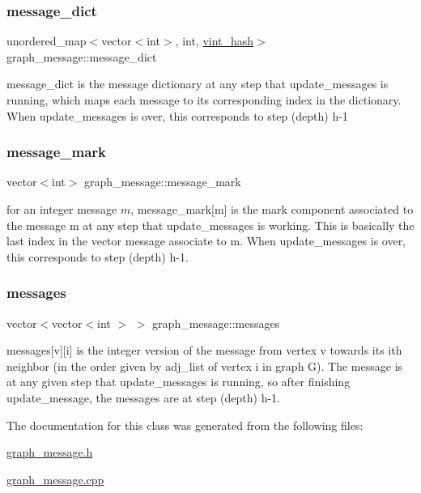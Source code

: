 \subsubsection{\texorpdfstring{message\+\_\+dict}{message\_dict}}
{\footnotesize\ttfamily unordered\+\_\+map$<$vector$<$int$>$, int, \hyperlink{structvint__hash}{vint\+\_\+hash}$>$ graph\+\_\+message\+::message\+\_\+dict}



message\+\_\+dict is the message dictionary at any step that update\+\_\+messages is running, which maps each message to its corresponding index in the dictionary. When update\+\_\+messages is over, this corresponds to step (depth) h-\/1 

\mbox{\label{classgraph__message_a49d9af5150daf0599c29fe18cb032fa5}} 
\subsubsection{\texorpdfstring{message\+\_\+mark}{message\_mark}}
{\footnotesize\ttfamily vector$<$int$>$ graph\+\_\+message\+::message\+\_\+mark}



for an integer message $m$, message\+\_\+mark\mbox{[}m\mbox{]} is the mark component associated to the message m at any step that update\+\_\+messages is working. This is basically the last index in the vector message associate to m. When update\+\_\+messages is over, this corresponds to step (depth) h-\/1. 

\mbox{\label{classgraph__message_af680c8a1755cf8d4aba389c1a3d6634e}} 
\subsubsection{\texorpdfstring{messages}{messages}}
{\footnotesize\ttfamily vector$<$vector$<$int $>$ $>$ graph\+\_\+message\+::messages}



messages\mbox{[}v\mbox{]}\mbox{[}i\mbox{]} is the integer version of the message from vertex v towards its ith neighbor (in the order given by adj\+\_\+list of vertex i in graph G). The message is at any given step that update\+\_\+messages is running, so after finishing update\+\_\+message, the messages are at step (depth) h-\/1. 



The documentation for this class was generated from the following files\+:\begin{DoxyCompactItemize}
\item 
\hyperlink{graph__message_8h}{graph\+\_\+message.\+h}\item 
\hyperlink{graph__message_8cpp}{graph\+\_\+message.\+cpp}\end{DoxyCompactItemize}
